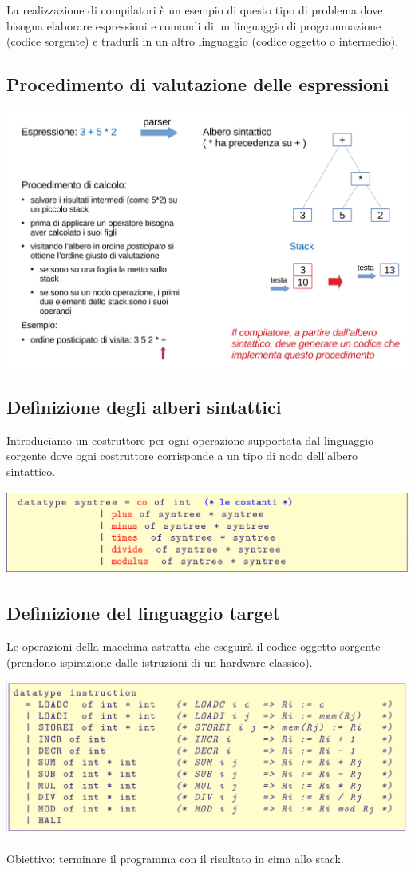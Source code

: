 \documentclass[10pt]{article}
\begin{document}
La realizzazione di compilatori è un esempio di questo tipo di
problema dove bisogna elaborare espressioni e comandi di un linguaggio di
programmazione (codice sorgente) e tradurli in un altro
linguaggio (codice oggetto o intermedio).

\subsection{Procedimento di valutazione delle espressioni}
\includegraphics[scale=0.2]{Immagini/comp1.png}
\subsection{Definizione degli alberi sintattici}
Introduciamo un costruttore per ogni operazione supportata dal
linguaggio sorgente dove 
ogni costruttore corrisponde a un tipo di nodo dell’albero
sintattico.

\includegraphics[scale=0.3]{Immagini/comp2.png}
\subsection{Definizione del linguaggio target}
Le operazioni della macchina astratta che eseguirà il
codice oggetto sorgente (prendono ispirazione dalle istruzioni di un hardware classico).

\includegraphics[scale=0.3]{Immagini/comp3.png}
\\\\
Obiettivo: terminare il programma con il risultato in cima allo stack.
\end{document}
